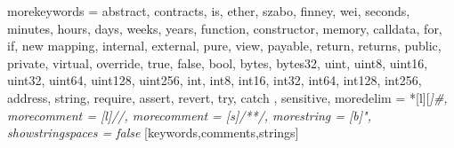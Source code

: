 

%
{morekeywords = {
  abstract, contracts, is,
  ether, szabo, finney, wei,
  seconds, minutes, hours, days, weeks, years,
  function, constructor, memory, calldata,
  for, if, new
  mapping,
  internal, external, pure, view, payable, return, returns,
  public, private, virtual, override,
  true, false, bool,
  bytes, bytes32,
  uint, uint8, uint16, uint32, uint64, uint128, uint256,
  int, int8, int16, int32, int64, int128, int256,
  address, string,
  require, assert, revert, try, catch
  },%
  sensitive,%
  moredelim = *[l][\itshape]{\#},
  morecomment = [l]//,%
  morecomment = [s]{/*}{*/},%
  morestring = [b]",%
  showstringspaces = false%
}[keywords,comments,strings]%



\newcommand{\commentstyle}[1]{\color{ccomment}\itshape{#1}}
\newcommand{\keywordstyle}[1]{\color{ckeyword}\bfseries{#1}}
\newcommand{\stringstyle}[1]{\color{cstring}\text{#1}}

